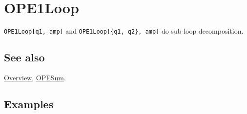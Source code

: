 \documentclass[../FeynCalcManual.tex]{subfiles}
\begin{document}
\hypertarget{ope1loop}{%
\section{OPE1Loop}\label{ope1loop}}

\texttt{OPE1Loop[\allowbreak{}q1,\ \allowbreak{}amp]} and
\texttt{OPE1Loop[\allowbreak{}\{\allowbreak{}q1,\ \allowbreak{}q2\},\ \allowbreak{}amp]}
do sub-loop decomposition.

\subsection{See also}

\hyperlink{toc}{Overview}, \hyperlink{opesum}{OPESum}.

\subsection{Examples}
\end{document}
